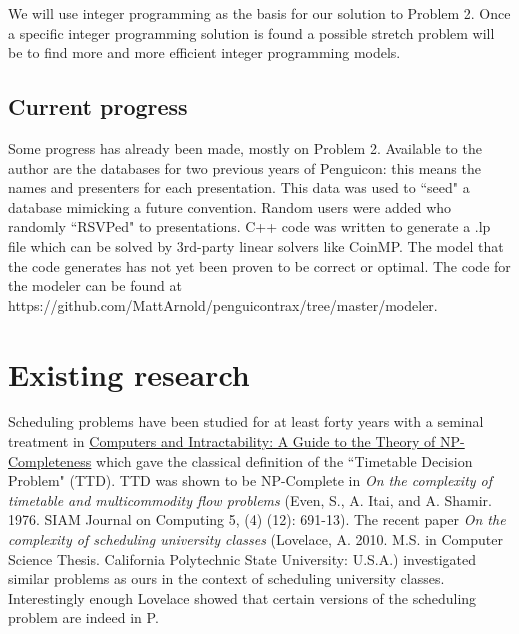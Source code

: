 \documentclass[]{article}
\theoremstyle{definition}
\theoremstyle{remark}
\numberwithin{equation}{section}
\begin{document}
We will use integer programming as the basis for our solution to Problem 2. Once a specific integer programming solution is found a possible stretch problem will be to find more and more efficient integer programming models.

\subsection{Current progress}
Some progress has already been made, mostly on Problem 2. Available to the author are the databases for two previous years of Penguicon: this means the names and presenters for each presentation. This data was used to ``seed" a database mimicking a future convention. Random users were added who randomly ``RSVPed" to presentations. C++ code was written to generate a .lp file which can be solved by 3rd-party linear solvers like CoinMP. The model that the code generates has not yet been proven to be correct or optimal. The code for the modeler can be found at https://github.com/MattArnold/penguicontrax/tree/master/modeler.

\section{Existing research}
Scheduling problems have been studied for at least forty years with a seminal treatment in \ul{Computers and Intractability: A Guide to the Theory of NP-Completeness} which gave the classical definition of the ``Timetable Decision Problem" (TTD). TTD was shown to be NP-Complete in \textit{On the complexity of timetable and multicommodity flow problems} (Even, S., A. Itai, and A. Shamir. 1976. SIAM Journal on Computing 5, (4) (12): 691-13). The recent paper \textit{On the complexity of scheduling university classes} (Lovelace, A. 2010. M.S. in Computer Science Thesis. California Polytechnic State University: U.S.A.) investigated similar problems as ours in the context of scheduling university classes. Interestingly enough Lovelace showed that certain versions of the scheduling problem are indeed in P.
\end{document}
